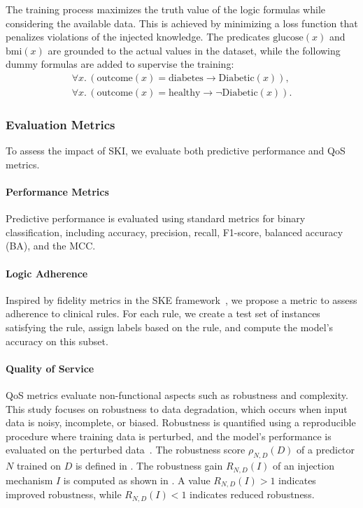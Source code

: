 %
The training process maximizes the truth value of the logic formulas while considering the available data.
%
This is achieved by minimizing a loss function that penalizes violations of the injected knowledge.
%
The predicates \(\text{glucose}(x)\) and \(\text{bmi}(x)\) are grounded to the actual values in the dataset, while the following dummy formulas are added to supervise the training:
%
\begin{align}
    \forall x.\, (\text{outcome}(x) = \text{diabetes} \rightarrow \text{Diabetic}(x)), \\
    \forall x.\, (\text{outcome}(x) = \text{healthy} \rightarrow \neg \text{Diabetic}(x)).
\end{align}

%
\subsubsection{Evaluation Metrics}
\label{subsubsec:evaluation-metrics}
%
To assess the impact of \gls{SKI}, we evaluate both predictive performance and \gls{QoS} metrics.

%
\paragraph{Performance Metrics}
%
Predictive performance is evaluated using standard metrics for binary classification, including accuracy, precision, recall, F1-score, balanced accuracy (BA), and the \gls{MCC}.

%
\paragraph{Logic Adherence}
%
Inspired by fidelity metrics in the \gls{SKE} framework~\cite{DBLP:journals/csur/CiattoSAMO24}, we propose a metric to assess adherence to clinical rules.
%
For each rule, we create a test set of instances satisfying the rule, assign labels based on the rule, and compute the model's accuracy on this subset.

%
\paragraph{Quality of Service}
%
\gls{QoS} metrics evaluate non-functional aspects such as robustness and complexity.
%
This study focuses on robustness to data degradation, which occurs when input data is noisy, incomplete, or biased.
%
Robustness is quantified using a reproducible procedure where training data is perturbed, and the model's performance is evaluated on the perturbed data~\cite{DBLP:journals/aamas/AgiolloRMCO23}.
%
The robustness score \(\rho_{N, D}(D)\) of a predictor \(N\) trained on \(D\) is defined in .
%
The robustness gain \(R_{N, D}(I)\) of an injection mechanism \(I\) is computed as shown in .
%
A value \(R_{N, D}(I) > 1\) indicates improved robustness, while \(R_{N, D}(I) < 1\) indicates reduced robustness.



